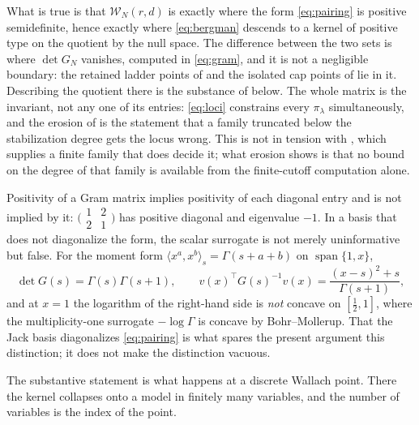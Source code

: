 \documentclass[11pt,letterpaper]{article}
\begin{document}
What is true is that $\mathcal{W}_N(r,d)$ is exactly where the form
\eqref{eq:pairing} is positive semidefinite, hence exactly where
\eqref{eq:bergman} descends to a kernel of positive type on the quotient by the
null space. The difference between the two sets is where $\det G_N$ vanishes,
computed in \eqref{eq:gram}, and it is not a negligible boundary: the retained
ladder points of  and the isolated cap points of
 lie in it. Describing the quotient there is the substance of
 below. The whole matrix is the invariant, not any one of its
entries: \eqref{eq:loci} constrains every $\pi_\lambda$ simultaneously, and the
erosion of  is the statement that a family truncated below the
stabilization degree gets the locus wrong. This is not in tension with
, which supplies a finite family that does decide it; what
erosion shows is that no bound on the degree of that family is available from the
finite-cutoff computation alone.

\begin{remark}
\label{rem:sylvester}
Positivity of a Gram matrix implies positivity of each diagonal entry and is not
implied by it: $\bigl(\begin{smallmatrix}1&2\\2&1\end{smallmatrix}\bigr)$ has
positive diagonal and eigenvalue $-1$. In a basis that does not diagonalize the
form, the scalar surrogate is not merely uninformative but false. For the moment
form $\langle x^a,x^b\rangle_s=\Gamma(s+a+b)$ on $\operatorname{span}\{1,x\}$,
\begin{equation*}
  \det G(s)=\Gamma(s)\Gamma(s+1),\qquad
  v(x)^{\!\top}G(s)^{-1}v(x)=\frac{(x-s)^2+s}{\Gamma(s+1)} ,
\end{equation*}
and at $x=1$ the logarithm of the right-hand side is \emph{not} concave on
$[\tfrac12,1]$, where the multiplicity-one surrogate $-\log\Gamma$ is concave by
Bohr--Mollerup. That the Jack basis diagonalizes \eqref{eq:pairing} is what
spares the present argument this distinction; it does not make the distinction
vacuous.
\end{remark}

The substantive statement is what happens at a discrete Wallach point. There the
kernel collapses onto a model in finitely many variables, and the number of
variables is the index of the point.
\end{document}
